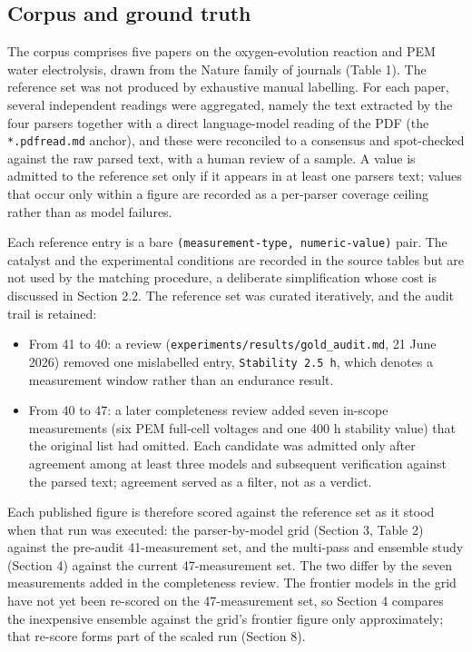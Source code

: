 \subsection{Corpus and ground truth}\label{corpus-and-ground-truth}

The corpus comprises five papers on the oxygen-evolution reaction and
PEM water electrolysis, drawn from the Nature family of journals (Table
1). The reference set was not produced by exhaustive manual labelling.
For each paper, several independent readings were aggregated, namely the
text extracted by the four parsers together with a direct language-model
reading of the PDF (the \texttt{*.pdfread.md} anchor), and these were
reconciled to a consensus and spot-checked against the raw parsed text,
with a human review of a sample. A value is admitted to the reference
set only if it appears in at least one parser\textquotesingle s text;
values that occur only within a figure are recorded as a per-parser
coverage ceiling rather than as model failures.

Each reference entry is a bare
\texttt{(measurement-type,\ numeric-value)} pair. The catalyst and the
experimental conditions are recorded in the source tables but are not
used by the matching procedure, a deliberate simplification whose cost
is discussed in Section 2.2. The reference set was curated iteratively,
and the audit trail is retained:

\begin{itemize}
\tightlist
\item
  From 41 to 40: a review (\texttt{experiments/results/gold\_audit.md},
  21 June 2026) removed one mislabelled entry,
  \texttt{Stability\ 2.5\ h}, which denotes a measurement window rather
  than an endurance result.
\item
  From 40 to 47: a later completeness review added seven in-scope
  measurements (six PEM full-cell voltages and one 400 h stability
  value) that the original list had omitted. Each candidate was admitted
  only after agreement among at least three models and subsequent
  verification against the parsed text; agreement served as a filter,
  not as a verdict.
\end{itemize}

Each published figure is therefore scored against the reference set as
it stood when that run was executed: the parser-by-model grid (Section
3, Table 2) against the pre-audit 41-measurement set, and the multi-pass
and ensemble study (Section 4) against the current 47-measurement set.
The two differ by the seven measurements added in the completeness
review. The frontier models in the grid have not yet been re-scored on
the 47-measurement set, so Section 4 compares the inexpensive ensemble
against the grid's frontier figure only approximately; that re-score
forms part of the scaled run (Section 8).

